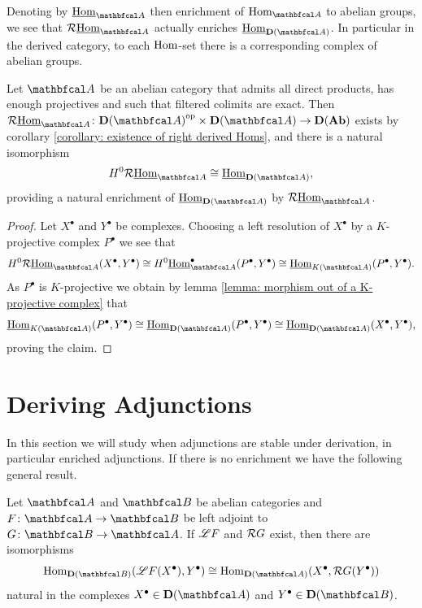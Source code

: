 Denoting by $\eHom_\category{A}$ then enrichment of $\Hom_\category{A}$ to abelian groups, we see that $\eRHom_\category{A}$ actually enriches $\eHom_\derived{\category{A}}$. In particular in the derived category, to each ${\operatorname{Hom}}$-set there is a corresponding complex of abelian groups.
\begin{lemma}
	\label{lemma: eRHom enriches Hom-sets in the derived category}
	
	Let $\category{A}$ be an abelian category that admits all direct products, has enough projectives and such that filtered colimits are exact. Then $\eRHom_\category{A}\colon \derived{\category{A}}^\op \times\derived{\category{A}}\to\derived{\Ab}$ exists by corollary \ref{corollary: existence of right derived Homs}, and there is a natural isomorphism
	$$H^0\eRHom_\category{A} \cong \eHom_\derived{\category{A}},$$
	providing a natural enrichment of $\eHom_\derived{\category{A}}$ by $\eRHom_\category{A}$.
\end{lemma}
\begin{proof}
	Let $X^\bullet$ and $Y^\bullet$ be complexes. Choosing a left resolution of $X^\bullet$ by a $K$-projective complex $P^\bullet$ we see that
	$$H^0\eRHom_\category{A}(X^\bullet, Y^\bullet) \cong H^0 \eHom_\category{A}^\bullet(P^\bullet, Y^\bullet) \cong \eHom_\homotopyCategoryOfComplexes{\category{A}}(P^\bullet, Y^\bullet).$$
	As $P^\bullet$ is $K$-projective we obtain by lemma \ref{lemma: morphism out of a K-projective complex} that
	$$\eHom_\homotopyCategoryOfComplexes{\category{A}}(P^\bullet, Y^\bullet)\cong \eHom_\derived{\category{A}}(P^\bullet, Y^\bullet) \cong \eHom_\derived{\category{A}}(X^\bullet, Y^\bullet),$$
	proving the claim.
\end{proof}

\section{Deriving Adjunctions}

In this section we will study when adjunctions are stable under derivation, in particular enriched adjunctions. If there is no enrichment we have the following general result.
\begin{lemma}
	\label{lemma: adjunctions are stable under derivation}
	
	Let $\category{A}$ and $\category{B}$ be abelian categories and $F\colon \category{A} \to \category{B}$ be left adjoint to $G\colon \category{B}\to\category{A}$. If $\mathscr{L} F$ and $\mathcal{R} G$ exist, then there are isomorphisms
	$$\Hom_\derived{\category{B}}(\LeftD F(X^\bullet), Y^\bullet) \cong \Hom_\derived{\category{A}}(X^\bullet, \RightD G(Y^\bullet))$$
	natural in the complexes $X^\bullet \in \derived{\category{A}}$ and $Y^\bullet \in \derived{\category{B}}$.
\end{lemma}

